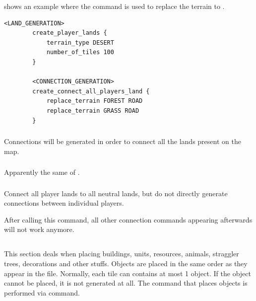 \begin{appendices}
     shows an example where the command is used to replace the terrain to .

    \begin{lstlisting}[language={rms}, label={lst:connectionteam}, caption={Example showing how you can connect teammates with roads.}]
        <LAND_GENERATION>
        create_player_lands {
            terrain_type DESERT
            number_of_tiles 100
        }

        <CONNECTION_GENERATION>
        create_connect_all_players_land {
            replace_terrain FOREST ROAD
            replace_terrain GRASS ROAD
        }
    \end{lstlisting}

    \subsubsection{}

    Connections will be generated in order to connect all the lands present on the map.

    \subsubsection{}

    Apparently the same of .

    \subsubsection{}

    Connect all player lands to all neutral lands, but do not directly generate connections between individual players.

    \begin{attention}
        After calling this command, all other connection commands appearing afterwards will not work anymore.
    \end{attention}

    \subsection{}

    This section deals when placing buildings, units, resources, animals, straggler trees, decorations and other stuffs. Objects are placed in the same order as they appear in the  file. Normally, each tile can contains at most 1 object. If the object cannot be placed, it is not generated at all. The command that places objects is performed via  command.


\end{appendices}
